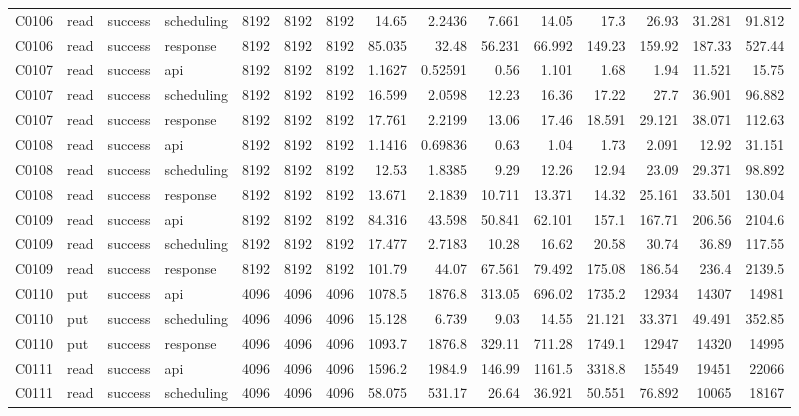 \begin{landscape}
\begin{longtable}{llllrrrrrrrrrrr}
C0106 & read & success & scheduling & 8192 & 8192 & 8192 & 14.65 & 2.2436 & 7.661 & 14.05 & 17.3 & 26.93 & 31.281 & 91.812\\
C0106 & read & success & response & 8192 & 8192 & 8192 & 85.035 & 32.48 & 56.231 & 66.992 & 149.23 & 159.92 & 187.33 & 527.44\\
C0107 & read & success & api & 8192 & 8192 & 8192 & 1.1627 & 0.52591 & 0.56 & 1.101 & 1.68 & 1.94 & 11.521 & 15.75\\
C0107 & read & success & scheduling & 8192 & 8192 & 8192 & 16.599 & 2.0598 & 12.23 & 16.36 & 17.22 & 27.7 & 36.901 & 96.882\\
C0107 & read & success & response & 8192 & 8192 & 8192 & 17.761 & 2.2199 & 13.06 & 17.46 & 18.591 & 29.121 & 38.071 & 112.63\\
C0108 & read & success & api & 8192 & 8192 & 8192 & 1.1416 & 0.69836 & 0.63 & 1.04 & 1.73 & 2.091 & 12.92 & 31.151\\
C0108 & read & success & scheduling & 8192 & 8192 & 8192 & 12.53 & 1.8385 & 9.29 & 12.26 & 12.94 & 23.09 & 29.371 & 98.892\\
C0108 & read & success & response & 8192 & 8192 & 8192 & 13.671 & 2.1839 & 10.711 & 13.371 & 14.32 & 25.161 & 33.501 & 130.04\\
C0109 & read & success & api & 8192 & 8192 & 8192 & 84.316 & 43.598 & 50.841 & 62.101 & 157.1 & 167.71 & 206.56 & 2104.6\\
C0109 & read & success & scheduling & 8192 & 8192 & 8192 & 17.477 & 2.7183 & 10.28 & 16.62 & 20.58 & 30.74 & 36.89 & 117.55\\
C0109 & read & success & response & 8192 & 8192 & 8192 & 101.79 & 44.07 & 67.561 & 79.492 & 175.08 & 186.54 & 236.4 & 2139.5\\
C0110 & put & success & api & 4096 & 4096 & 4096 & 1078.5 & 1876.8 & 313.05 & 696.02 & 1735.2 & 12934 & 14307 & 14981\\
C0110 & put & success & scheduling & 4096 & 4096 & 4096 & 15.128 & 6.739 & 9.03 & 14.55 & 21.121 & 33.371 & 49.491 & 352.85\\
C0110 & put & success & response & 4096 & 4096 & 4096 & 1093.7 & 1876.8 & 329.11 & 711.28 & 1749.1 & 12947 & 14320 & 14995\\
C0111 & read & success & api & 4096 & 4096 & 4096 & 1596.2 & 1984.9 & 146.99 & 1161.5 & 3318.8 & 15549 & 19451 & 22066\\
C0111 & read & success & scheduling & 4096 & 4096 & 4096 & 58.075 & 531.17 & 26.64 & 36.921 & 50.551 & 76.892 & 10065 & 18167\\

\end{longtable}
\end{landscape}
